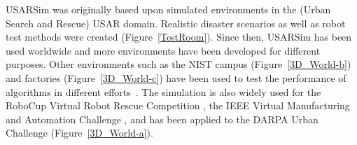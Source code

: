 


USARSim was originally based upon simulated environments in the (Urban Search and Rescue) USAR domain. Realistic disaster scenarios as well as robot test methods were created (Figure~\ref{TestRoom}).
Since then, USARSim has been used worldwide and more environments have been developed for different purposes. Other environments such as the NIST campus (Figure~\ref{3D_World-b}) and factories (Figure~\ref{3D_World-c}) have been used to test the performance of algorithms in different efforts~\cite{WANG.HFES.2005,BALAGUER.IROS.2008,KOOTBALLY.ITEA.2010}. The simulation is also widely used for the RoboCup Virtual Robot Rescue Competition \cite{RoboCupWeb}, the IEEE Virtual Manufacturing and Automation Challenge \cite{VMACWeb}, and has been applied to the DARPA Urban Challenge (Figure~\ref{3D_World-a}).

